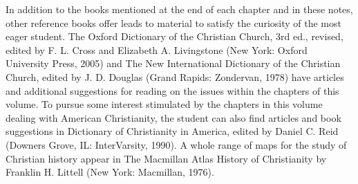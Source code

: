 \begin{notelist}
\entry In addition to the books mentioned at the end of each chapter and in these notes, other
  reference books offer leads to material to satisfy the curiosity of the most eager student. The
  Oxford Dictionary of the Christian Church, 3rd ed., revised, edited by F. L. Cross and Elizabeth
  A. Livingstone (New York: Oxford University Press, 2005) and The New International Dictionary of
  the Christian Church, edited by J. D. Douglas (Grand Rapids: Zondervan, 1978) have articles and
  additional suggestions for reading on the issues within the chapters of this volume.
\entry To pursue some interest stimulated by the chapters in this volume dealing with American
  Christianity, the student can also find articles and book suggestions in Dictionary of
  Christianity in America, edited by Daniel C. Reid (Downers Grove, IL: InterVarsity, 1990). A whole
  range of maps for the study of Christian history appear in The Macmillan Atlas History of
  Christianity by Franklin H. Littell (New York: Macmillan, 1976).
\end{notelist}
